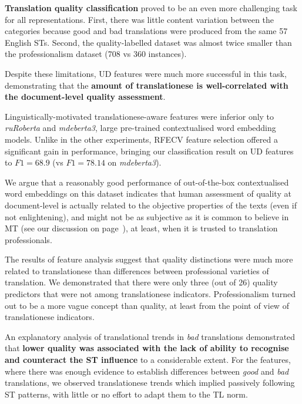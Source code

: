 \textbf{Translation quality classification} proved to be an even more challenging task for all representations. First, there was little content variation between the categories because good and bad translations were produced from the same 57 English STs. Second, the quality-labelled dataset was almost twice smaller than the professionalism dataset (708 vs 360 instances). %

Despite these limitations, UD features were much more successful in this task, demonstrating that the \textbf{amount of translationese is well-correlated with the document-level quality assessment}. 

\label{pg:translationese_indicators_work_for_binary_labels}
Linguistically-motivated translationese-aware features were inferior only to \textit{ruRoberta} and \textit{mdeberta3}, large pre-trained contextualised word embedding models. Unlike in the other experiments, RFECV feature selection offered a significant gain in performance, bringing our classification result on UD features to $F1=68.9$ (vs $F1=78.14$ on \textit{mdeberta3}).

We argue that a reasonably good performance of out-of-the-box contextualised word embeddings on this dataset indicates that human assessment of quality at document-level is actually related to the objective properties of the texts (even if not enlightening), and might not be as subjective as it is common to believe in MT (see our discussion on page~\pageref{pg:pessimism}), at least, when it is trusted to translation professionals. 

The results of feature analysis suggest that quality distinctions were much more related to translationese than differences between professional varieties of translation. 
We demonstrated that there were only three (out of 26) quality predictors that were not among translationese indicators. Professionalism turned out to be a more vague concept than quality, at least from the point of view of translationese indicators.

An explanatory analysis of translational trends in \textit{bad} translations demonstrated that \textbf{lower quality was associated with the lack of ability to recognise and counteract the ST influence} to a considerable extent. For the features, where there was enough evidence to establish differences between \textit{good} and \textit{bad} translations, we observed translationese trends which implied passively following ST patterns, with little or no effort to adapt them to the TL norm.
 
